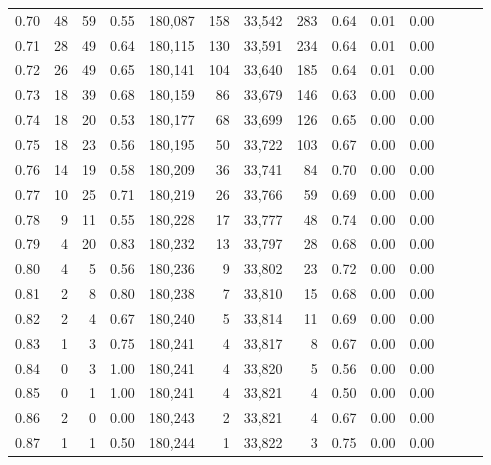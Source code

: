 \begin{tabular}{rrrrrrrrrrrrrr}
0.70 &      48 &     59 &  0.55 &  180,087 &      158 &  33,542 &     283 &  0.64 &  0.01 &      0.00 \\
0.71 &      28 &     49 &  0.64 &  180,115 &      130 &  33,591 &     234 &  0.64 &  0.01 &      0.00 \\
0.72 &      26 &     49 &  0.65 &  180,141 &      104 &  33,640 &     185 &  0.64 &  0.01 &      0.00 \\
0.73 &      18 &     39 &  0.68 &  180,159 &       86 &  33,679 &     146 &  0.63 &  0.00 &      0.00 \\
0.74 &      18 &     20 &  0.53 &  180,177 &       68 &  33,699 &     126 &  0.65 &  0.00 &      0.00 \\
0.75 &      18 &     23 &  0.56 &  180,195 &       50 &  33,722 &     103 &  0.67 &  0.00 &      0.00 \\
0.76 &      14 &     19 &  0.58 &  180,209 &       36 &  33,741 &      84 &  0.70 &  0.00 &      0.00 \\
0.77 &      10 &     25 &  0.71 &  180,219 &       26 &  33,766 &      59 &  0.69 &  0.00 &      0.00 \\
0.78 &       9 &     11 &  0.55 &  180,228 &       17 &  33,777 &      48 &  0.74 &  0.00 &      0.00 \\
0.79 &       4 &     20 &  0.83 &  180,232 &       13 &  33,797 &      28 &  0.68 &  0.00 &      0.00 \\
0.80 &       4 &      5 &  0.56 &  180,236 &        9 &  33,802 &      23 &  0.72 &  0.00 &      0.00 \\
0.81 &       2 &      8 &  0.80 &  180,238 &        7 &  33,810 &      15 &  0.68 &  0.00 &      0.00 \\
0.82 &       2 &      4 &  0.67 &  180,240 &        5 &  33,814 &      11 &  0.69 &  0.00 &      0.00 \\
0.83 &       1 &      3 &  0.75 &  180,241 &        4 &  33,817 &       8 &  0.67 &  0.00 &      0.00 \\
0.84 &       0 &      3 &  1.00 &  180,241 &        4 &  33,820 &       5 &  0.56 &  0.00 &      0.00 \\
0.85 &       0 &      1 &  1.00 &  180,241 &        4 &  33,821 &       4 &  0.50 &  0.00 &      0.00 \\
0.86 &       2 &      0 &  0.00 &  180,243 &        2 &  33,821 &       4 &  0.67 &  0.00 &      0.00 \\
0.87 &       1 &      1 &  0.50 &  180,244 &        1 &  33,822 &       3 &  0.75 &  0.00 &      0.00 \\

\end{tabular}
